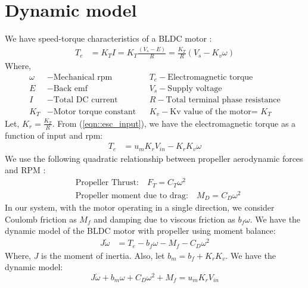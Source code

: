 \section{Dynamic model}


We have speed-torque characteristics of a BLDC motor \cite{crowder2019electric}:
\begin{align}
    T_e &= K_T I = K_T \frac{(V_s - E)}{R} = \frac{K_T}{R} (V_s - K_v \omega)
\end{align}
Where,
\begin{align*}
    \omega &- \text{Mechanical rpm} & &
    T_e      - \text{Electromagnetic torque}\\
    E        &- \text{Back emf} & &
    V_s      - \text{Supply voltage}\\
    I        &- \text{Total DC current}& &
    R        - \text{Total terminal phase resistance}\\
    K_T      &- \text{Motor torque constant} & &
    K_v      - \text{Kv value of the motor= $K_T$}
\end{align*}
Let, $K_r = \frac{K_T}{R}$.
From (\ref{eqn::esc_input}), we have the electromagnetic torque as a function
of input and rpm:
\begin{align}\label{eqn::Te}
    T_e &= u_m K_r V_{in} - K_r K_v \omega
\end{align}
We use the following quadratic relationship between propeller aerodynamic forces
and RPM \cite{pounds2010modelling}:
\begin{align}
    &\text{Propeller Thrust:}\quad
    F_T = C_{T} \omega^2\\
    &\text{Propeller moment due to drag:}\quad
    M_D = C_{D} \omega^2
\end{align}
In our system, with the motor operating in a single direction, we consider
Coulomb friction as $M_f$ and damping due to viscous friction as $b_f\omega$.
We have the dynamic model of the BLDC motor with propeller using moment balance:
\begin{align}
    J \dot \omega &= T_e - b_f \omega - M_f - C_D \omega^2
\end{align}
Where, $J$ is the moment of inertia. Also, let $b_m = b_f + K_rK_v$. We have the dynamic model:
\begin{equation}\label{eqn::dyn_mdl}
    J\dot \omega + b_m \omega + C_D \omega^2 + M_f = u_m K_r V_{in}
\end{equation}




